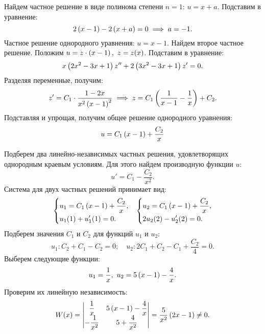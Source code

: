 \begin{enumerate}
				Найдем частное решение в виде полинома степени $n = 1$: $u = x + a$. Подставим в уравнение:
				\[ 2 \left( x - 1 \right) - 2 \left( x + a \right) = 0 \implies a = -1. \]
				Частное решение однородного уравнения: $u = x - 1$. Найдем второе частное решение. Положим $u = z \cdot \left( x - 1 \right), ~ z = z(x)$. Подставим в уравнение:
				\[ x\left( 2x^2 - 3x + 1 \right) z'' + 2\left( 3x^2 - 3x + 1 \right) z' = 0. \]
				Разделяя переменные, получим:
				\[ z' = C_1 \cdot \frac{1 - 2x}{x^2 \left( x-1 \right)^2} \implies z = C_1 \left( \frac{1}{x-1} - \frac{1}{x} \right) + C_2. \]
				Подставляя и упрощая, получим общее решение однородного уравнения:
				\[ u = C_1 \left( x - 1 \right) + \frac{C_2}{x} \]

				Подберем два линейно-независимых частных решения, удовлетворящих однородным краевым условиям. Для этого найдем производную функции $u$:
				\[ u' = C_1 - \frac{C_2}{x^2}. \]
				Система для двух частных решений принимает вид:
				\[ \begin{matrix}
					\left\lbrace \begin{aligned} &u_1 = C_1 \left( x - 1 \right) + \frac{C_2}{x}, \\ &u_1(1) + u_1'(1) = 0. \end{aligned} \right. & 
					\left\lbrace \begin{aligned} &u_2 = C_1 \left( x - 1 \right) + \frac{C_2}{x}, \\ &2u_2(2) - u_2'(2) = 0. \end{aligned} \right. 
				\end{matrix} \]
				Подберем значения $C_1$ и $C_2$ для функций $u_1$ и $u_2$:
				\[ u_1: C_2 + C_1 - C_2 = 0; \quad u_2: 2C_1 + C_2 - C_1 + \frac{C_2}4 = 0. \]
				Выберем следующие функции:
				\[ u_1 = \frac{1}{x}, ~ u_2 = 5 \left( x - 1 \right) - \frac{4}{x}. \]
				Проверим их линейную независимость:
				\[ W(x) = \begin{vmatrix} 
					\dfrac{1}{x} & 5 \left( x - 1 \right) - \dfrac{4}{x} \\
					-\dfrac{1}{x^2} & 5 + \dfrac{4}{x^2}
				\end{vmatrix} = \frac{5}{x^2} \left( 2x - 1 \right) \neq 0. \]


\end{enumerate}
